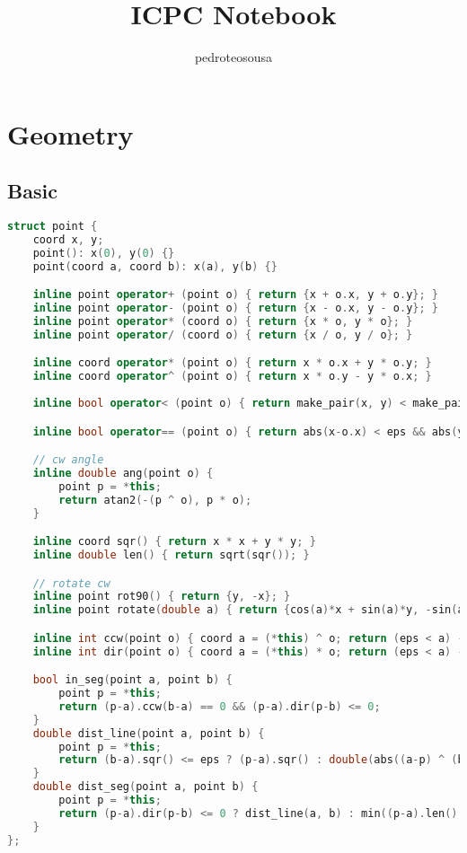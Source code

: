\documentclass{article}
\title{ICPC Notebook}
\author{pedroteosousa}
\date{}
\begin{document}

\maketitle
\tableofcontents

\section{Geometry}
\subsection{Basic}
\begin{lstlisting}[language=C++]
struct point {
    coord x, y;
    point(): x(0), y(0) {}
    point(coord a, coord b): x(a), y(b) {}

    inline point operator+ (point o) { return {x + o.x, y + o.y}; }
    inline point operator- (point o) { return {x - o.x, y - o.y}; }
    inline point operator* (coord o) { return {x * o, y * o}; }
    inline point operator/ (coord o) { return {x / o, y / o}; }

    inline coord operator* (point o) { return x * o.x + y * o.y; }
    inline coord operator^ (point o) { return x * o.y - y * o.x; }
    
    inline bool operator< (point o) { return make_pair(x, y) < make_pair(o.x, o.y); }

    inline bool operator== (point o) { return abs(x-o.x) < eps && abs(y-o.y) < eps; }

    // cw angle
    inline double ang(point o) {
        point p = *this;
        return atan2(-(p ^ o), p * o);
    }

    inline coord sqr() { return x * x + y * y; }
    inline double len() { return sqrt(sqr()); }

    // rotate cw
    inline point rot90() { return {y, -x}; }
    inline point rotate(double a) { return {cos(a)*x + sin(a)*y, -sin(a)*x + cos(a)*y}; }

    inline int ccw(point o) { coord a = (*this) ^ o; return (eps < a) - (a < -eps); }
    inline int dir(point o) { coord a = (*this) * o; return (eps < a) - (a < -eps); }

    bool in_seg(point a, point b) {
        point p = *this;
        return (p-a).ccw(b-a) == 0 && (p-a).dir(p-b) <= 0;
    }
    double dist_line(point a, point b) {
        point p = *this;
        return (b-a).sqr() <= eps ? (p-a).sqr() : double(abs((a-p) ^ (b-p))) / (b-a).len();
    }
    double dist_seg(point a, point b) {
        point p = *this;
        return (p-a).dir(p-b) <= 0 ? dist_line(a, b) : min((p-a).len(), (p-b).len());
    }
};


\end{lstlisting}
\end{document}
